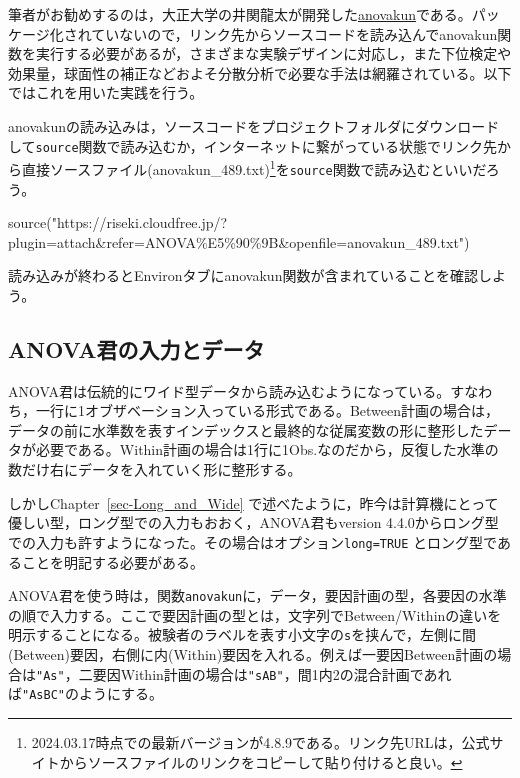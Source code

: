 \documentclass[
  a4paper,
]{ltjsbook}
\newenvironment{Shaded}{\begin{snugshade}}{\end{snugshade}}
\newcommand{\FunctionTok}[1]{\textcolor[rgb]{0.28,0.35,0.67}{#1}}
\newcommand{\NormalTok}[1]{\textcolor[rgb]{0.00,0.23,0.31}{#1}}
\newcommand{\StringTok}[1]{\textcolor[rgb]{0.13,0.47,0.30}{#1}}
\begin{document}
筆者がお勧めするのは，大正大学の井関龍太が開発した\href{https://riseki.cloudfree.jp/?ANOVA君}{anovakun}である。パッケージ化されていないので，リンク先からソースコードを読み込んでanovakun関数を実行する必要があるが，さまざまな実験デザインに対応し，また下位検定や効果量，球面性の補正などおよそ分散分析で必要な手法は網羅されている。以下ではこれを用いた実践を行う。

anovakunの読み込みは，ソースコードをプロジェクトフォルダにダウンロードして\texttt{source}関数で読み込むか，インターネットに繋がっている状態でリンク先から直接ソースファイル(anovakun\_489.txt)\footnote{2024.03.17時点での最新バージョンが4.8.9である。リンク先URLは，公式サイトからソースファイルのリンクをコピーして貼り付けると良い。}を\texttt{source}関数で読み込むといいだろう。

\begin{Shaded}
\begin{Highlighting}[]
\FunctionTok{source}\NormalTok{(}\StringTok{"https://riseki.cloudfree.jp/?plugin=attach\&refer=ANOVA\%E5\%90\%9B\&openfile=anovakun\_489.txt"}\NormalTok{)}
\end{Highlighting}
\end{Shaded}

読み込みが終わるとEnvironタブにanovakun関数が含まれていることを確認しよう。

\subsection{ANOVA君の入力とデータ}\label{anovaux541bux306eux5165ux529bux3068ux30c7ux30fcux30bf}

ANOVA君は伝統的にワイド型データから読み込むようになっている。すなわち，一行に1オブザベーション入っている形式である。Between計画の場合は，データの前に水準数を表すインデックスと最終的な従属変数の形に整形したデータが必要である。Within計画の場合は1行に1Obs.なのだから，反復した水準の数だけ右にデータを入れていく形に整形する。

しかしChapter~\ref{sec-Long_and_Wide}
で述べたように，昨今は計算機にとって優しい型，ロング型での入力もおおく，ANOVA君もversion
4.4.0からロング型での入力も許すようになった。その場合はオプション\texttt{long=TRUE}
とロング型であることを明記する必要がある。

ANOVA君を使う時は，関数\texttt{anovakun}に，データ，要因計画の型，各要因の水準の順で入力する。ここで要因計画の型とは，文字列でBetween/Withinの違いを明示することになる。被験者のラベルを表す小文字の\texttt{s}を挟んで，左側に間(Between)要因，右側に内(Within)要因を入れる。例えば一要因Between計画の場合は\texttt{"As"}，二要因Within計画の場合は\texttt{"sAB"}，間1内2の混合計画であれば\texttt{"AsBC"}のようにする。
\end{document}
